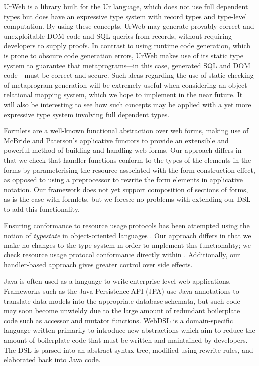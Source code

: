 Ur\/Web \cite{urweb} is a library built for the Ur language, which does not use
full dependent types but does have an expressive type system with 
record types and type-level computation.  By using these concepts,
Ur\/Web may generate provably correct and unexploitable DOM code and SQL
queries from records, without requiring developers to supply proofs.  In
contrast to using runtime code generation, which is prone to obscure code
generation errors, Ur\/Web makes use of its static type system to guarantee
that metaprograms---in this case, generated SQL and DOM code---must be correct
and secure.  Such ideas regarding the use of static checking of metaprogram
generation will be extremely useful when considering an object-relational
mapping system, which we hope to implement in the near future. It will also be
interesting to see how such concepts may be applied with a yet more expressive
type system involving full dependent types.

Formlets \cite{cooper:formlets} are a well-known functional abstraction over web forms, making use of McBride and Paterson's applicative functors \cite{mcbride:applicative} to provide an extensible and powerful method of building and handling web forms. 
Our approach differs in that we check that handler functions conform to the types of the elements in the forms by parameterising the resource associated with the form construction effect, as opposed to using a preprocessor to rewrite the form elements in applicative notation.
Our framework does not yet support composition of sections of forms, as is the case with formlets, but we foresee no problems with extending our DSL to add this functionality.

Ensuring conformance to resource usage protocols has been attempted using the
notion of \emph{typestate} in object-oriented languages
\cite{deline:typestates}. Our approach differs in that we make no changes to
the type system in order to implement this functionality; we check resource
usage protocol conformance directly within \idris{}.  Additionally, our
handler-based approach gives greater control over side effects.

Java is often used as a language to write enterprise-level web applications. Frameworks such as the Java Persistence API (JPA) \cite{jpa} use Java annotations to translate data models into the appropriate database schemata, but such code may soon become unwieldy due to the large amount of redundant boilerplate code such as accessor and mutator functions. WebDSL \cite{webdsl} is a domain-specific language written primarily to
introduce new abstractions which aim to reduce the amount of boilerplate code
that must be written and maintained by developers. 
The DSL is parsed into an abstract syntax tree, modified using rewrite rules, and elaborated back into Java code. 

